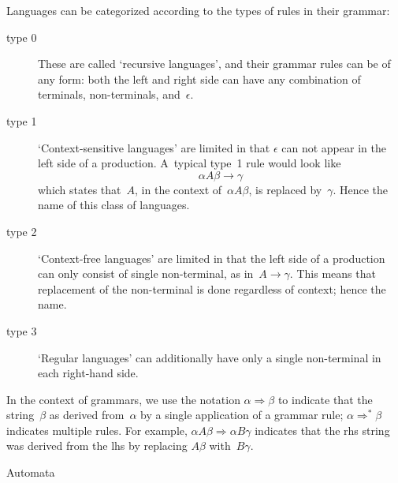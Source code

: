Languages can be categorized according to the types of rules in their grammar:
\begin{description}
\item[type 0] These are called `recursive
  languages', and their grammar rules can be of any form: both the
  left and right side can have any combination of terminals,
  non-terminals, and~$\epsilon$.
\item[type 1] `Context-sensitive
  languages' are limited in that $\epsilon$ can not appear in the left
  side of a production. A~typical type~1 rule would look like
\[ \alpha A\beta \rightarrow \gamma \]
  which states that~$A$, in the context of~$\alpha A\beta$, is
  replaced by~$\gamma$. Hence the name of this class of languages.
\item[type 2] `Context-free languages'
  are limited in that the left side of a production can only consist of
  single non-terminal, as in~$A\rightarrow\gamma$. This means that
  replacement of the non-terminal is done regardless of context; hence
  the name.
\item[type 3] `Regular languages' can
  additionally have only a single non-terminal in each right-hand
  side.
\end{description}

In the context of grammars, we use the notation
$\alpha\Rightarrow\beta$ to indicate that the string~$\beta$ as
derived from~$\alpha$ by a single application of a grammar rule;
$\alpha\Rightarrow^*\beta$ indicates multiple rules. For example,
$\alpha A\beta\Rightarrow\alpha B\gamma$ indicates that the rhs string
was derived from the lhs by replacing $A\beta$ with~$B\gamma$.

 {Automata}

